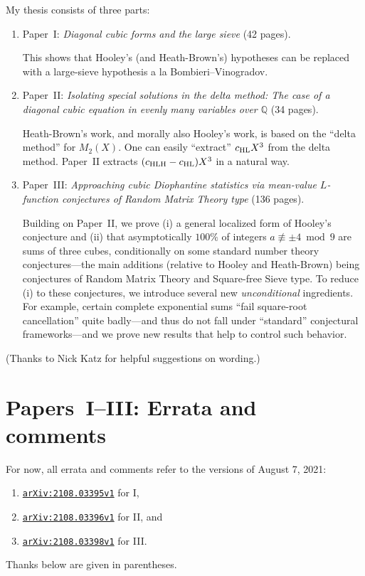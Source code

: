 \documentclass[12pt]{article}
\begin{document}
My thesis consists of three parts:
\begin{enumerate}
    \item Paper~I:
    \emph{Diagonal cubic forms and the large sieve}
    (42 pages).
    
    This shows that Hooley's (and Heath-Brown's) hypotheses can be replaced with
    a large-sieve hypothesis a la Bombieri--Vinogradov.
    
    \item Paper~II:
    \emph{Isolating special solutions in the delta method:
    The case of a diagonal cubic equation in evenly many variables over $\mathbb{Q}$}
    (34 pages).
    
    Heath-Brown's work, and morally also Hooley's work, is based on the ``delta method'' for $M_2(X)$.
    One can easily ``extract'' $c_{\textnormal{HL}}X^3$ from the delta method.
    Paper~II extracts $(c_{\textnormal{HLH}}-c_{\textnormal{HL}})X^3$ in a natural way.
    
    \item Paper~III:
    \emph{Approaching cubic Diophantine statistics via mean-value $L$-function conjectures of Random Matrix Theory type}
    (136 pages).
    
    Building on Paper~II,
    we prove (i) a general localized form of Hooley's conjecture
    and (ii) that asymptotically $100\%$ of integers $a\not\equiv \pm4\bmod{9}$ are sums of three cubes,
    conditionally on some standard number theory conjectures---the main additions (relative to Hooley and Heath-Brown) being conjectures of Random Matrix Theory and Square-free Sieve type.
    To reduce (i) to these conjectures,
    we introduce several new \emph{unconditional} ingredients.
    For example, certain complete exponential sums ``fail square-root cancellation'' quite badly---and thus do not fall under ``standard'' conjectural frameworks---and we prove new results that help to control such behavior.
\end{enumerate}

(Thanks to Nick Katz for helpful suggestions on wording.)

\section{Papers~I--III: Errata and comments}

For now, all errata and comments refer to the versions of August 7, 2021:
\begin{enumerate}
    \item \href{https://arxiv.org/abs/2108.03395v1}{\texttt{arXiv:2108.03395v1}} for I,
    
    \item \href{https://arxiv.org/abs/2108.03396v1}{\texttt{arXiv:2108.03396v1}} for II,
    and
    
    \item \href{https://arxiv.org/abs/2108.03398v1}{\texttt{arXiv:2108.03398v1}} for III.
\end{enumerate}
Thanks below are given in parentheses.
\end{document}
